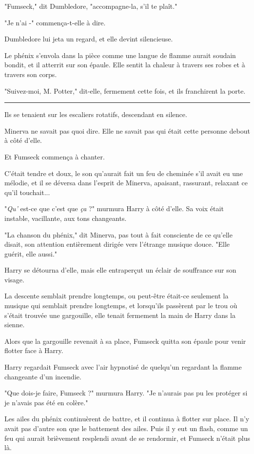 "Fumseck," dit Dumbledore, "accompagne-la, s'il te plaît."

"Je n'ai -" commença-t-elle à dire.

Dumbledore lui jeta un regard, et elle devint silencieuse.

Le phénix s'envola dans la pièce comme une langue de flamme aurait soudain bondit, et il atterrit sur son épaule. Elle sentit la chaleur à travers ses robes et à travers son corps.

"Suivez-moi, M. Potter," dit-elle, fermement cette fois, et ils franchirent la porte.
\par\noindent\rule{\textwidth}{0.4pt}
Ils se tenaient sur les escaliers rotatifs, descendant en silence.

Minerva ne savait pas quoi dire. Elle ne savait pas qui était cette personne debout à côté d'elle.

Et Fumseck commença à chanter.

C'était tendre et doux, le son qu'aurait fait un feu de cheminée s'il avait eu une mélodie, et il se déversa dans l'esprit de Minerva, apaisant, rassurant, relaxant ce qu'il touchait...

"\emph{Qu'} est-ce que c'est que \emph{ça}  ?" murmura Harry à côté d'elle. Sa voix était instable, vacillante, aux tons changeants.

"La chanson du phénix," dit Minerva, pas tout à fait consciente de ce qu'elle disait, son attention entièrement dirigée vers l'étrange musique douce. "Elle guérit, elle aussi."

Harry se détourna d'elle, mais elle entraperçut un éclair de souffrance sur son visage.

La descente semblait prendre longtemps, ou peut-être était-ce seulement la musique qui semblait prendre longtemps, et lorsqu'ils passèrent par le trou où s'était trouvée une gargouille, elle tenait fermement la main de Harry dans la sienne.

Alors que la gargouille revenait à sa place, Fumseck quitta son épaule pour venir flotter face à Harry.

Harry regardait Fumseck avec l'air hypnotisé de quelqu'un regardant la flamme changeante d'un incendie.

"Que dois-je faire, Fumseck ?" murmura Harry. "Je n'aurais pas pu les protéger si je n'avais pas été en colère."

Les ailes du phénix continuèrent de battre, et il continua à flotter sur place. Il n'y avait pas d'autre son que le battement des ailes. Puis il y eut un flash, comme un feu qui aurait brièvement resplendi avant de se rendormir, et Fumseck n'était plus là.

